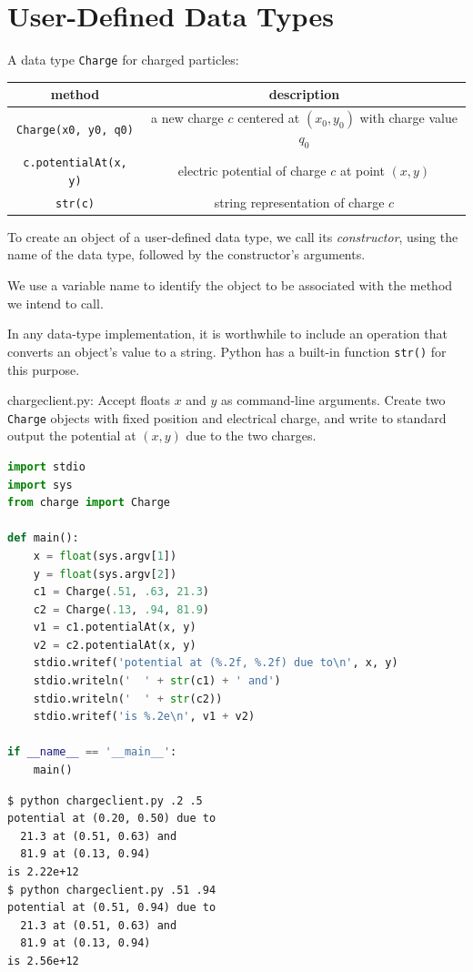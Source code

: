 \documentclass[8pt,a4paper,compress,handout]{beamer}
\begin{document}
\section{User-Defined Data Types}
\begin{frame}[fragile]
A data type \lstinline{Charge} for charged particles:
\begin{center}
\begin{tabular}{cc}
method & description \\ \hline
\lstinline$Charge(x0, y0, q0)$ & a new charge $c$ centered at $(x_0, y_0)$ with charge value $q_0$ \\
\lstinline$c.potentialAt(x, y)$ & electric potential of charge $c$ at point $(x, y)$ \\
\lstinline$str(c)$ & string representation of charge $c$
\end{tabular} 
\end{center}

\bigskip

To create an object of a user-defined data type, we call its \emph{constructor}, using the name of the data type, followed by the constructor's arguments.

\bigskip

We use a variable name to identify the object to be associated with the method we intend to call.

\bigskip

In any data-type implementation, it is worthwhile to include an operation that converts an object's value to a string. Python has a built-in function \lstinline{str()} for this purpose.
\end{frame}

\begin{frame}[fragile]
\begin{framed}
\tiny chargeclient.py: Accept floats $x$ and $y$ as command-line arguments. Create two \lstinline{Charge} objects with fixed position and electrical charge, and write to standard output the potential at $(x, y)$ due to the two charges.
\end{framed}

\begin{lstlisting}[language=Python]
import stdio
import sys
from charge import Charge

def main():
    x = float(sys.argv[1])
    y = float(sys.argv[2])
    c1 = Charge(.51, .63, 21.3)
    c2 = Charge(.13, .94, 81.9)
    v1 = c1.potentialAt(x, y)
    v2 = c2.potentialAt(x, y)
    stdio.writef('potential at (%.2f, %.2f) due to\n', x, y)
    stdio.writeln('  ' + str(c1) + ' and')
    stdio.writeln('  ' + str(c2))
    stdio.writef('is %.2e\n', v1 + v2)

if __name__ == '__main__':
    main()
\end{lstlisting}

\begin{lstlisting}[language={}]
$ python chargeclient.py .2 .5
potential at (0.20, 0.50) due to
  21.3 at (0.51, 0.63) and
  81.9 at (0.13, 0.94)
is 2.22e+12
$ python chargeclient.py .51 .94
potential at (0.51, 0.94) due to
  21.3 at (0.51, 0.63) and
  81.9 at (0.13, 0.94)
is 2.56e+12
\end{lstlisting}
\end{frame}
\end{document}
